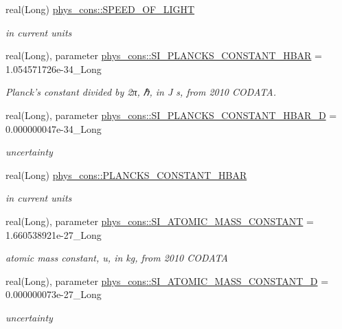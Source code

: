 \begin{DoxyCompactItemize}
real(Long) \hyperlink{namespacephys__cons_ac31faa4bb5e82aecbdffa3b3d43a1736}{phys\_\-cons::SPEED\_\-OF\_\-LIGHT}
\begin{DoxyCompactList}\small\item\em in current units \item\end{DoxyCompactList}\item 
real(Long), parameter \hyperlink{namespacephys__cons_ab49e79c21c913c5857dedf2c555d2c21}{phys\_\-cons::SI\_\-PLANCKS\_\-CONSTANT\_\-HBAR} = 1.054571726e-\/34\_\-Long
\begin{DoxyCompactList}\small\item\em Planck's constant divided by 2π, ℏ, in J s, from 2010 CODATA. \item\end{DoxyCompactList}\item 
real(Long), parameter \hyperlink{namespacephys__cons_af8ab82739d58ac3a1e1d9c97d3cfb4da}{phys\_\-cons::SI\_\-PLANCKS\_\-CONSTANT\_\-HBAR\_\-D} = 0.000000047e-\/34\_\-Long
\begin{DoxyCompactList}\small\item\em uncertainty \item\end{DoxyCompactList}\item 
real(Long) \hyperlink{namespacephys__cons_af0b754235993060b14fc81b7d1f702a5}{phys\_\-cons::PLANCKS\_\-CONSTANT\_\-HBAR}
\begin{DoxyCompactList}\small\item\em in current units \item\end{DoxyCompactList}\item 
real(Long), parameter \hyperlink{namespacephys__cons_a0a98df5d38297f3acc9d5557b4080055}{phys\_\-cons::SI\_\-ATOMIC\_\-MASS\_\-CONSTANT} = 1.660538921e-\/27\_\-Long
\begin{DoxyCompactList}\small\item\em atomic mass constant, u, in kg, from 2010 CODATA \item\end{DoxyCompactList}\item 
real(Long), parameter \hyperlink{namespacephys__cons_a6e13c059ed2f1228592194ed5f16222c}{phys\_\-cons::SI\_\-ATOMIC\_\-MASS\_\-CONSTANT\_\-D} = 0.000000073e-\/27\_\-Long
\begin{DoxyCompactList}\small\item\em uncertainty \item\end{DoxyCompactList}\item 

\end{DoxyCompactItemize}
